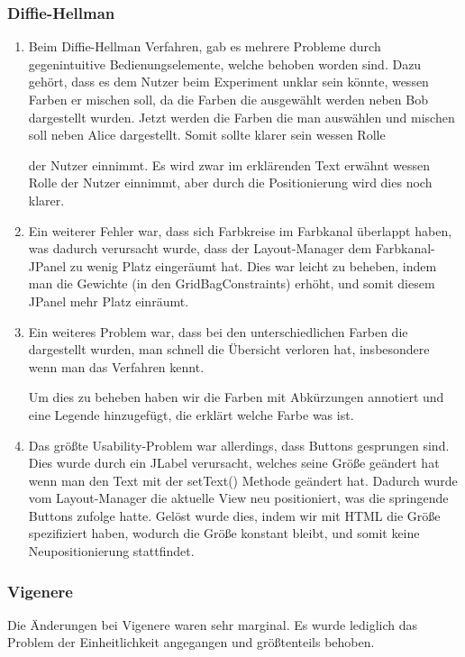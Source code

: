 \documentclass{article}
\begin{document}
     \subsubsection{Diffie-Hellman}
     \begin{enumerate}
         \item Beim Diffie-Hellman Verfahren, gab es mehrere Probleme durch gegenintuitive Bedienungselemente, welche behoben worden sind.
             Dazu gehört, dass es dem Nutzer beim Experiment unklar sein könnte, wessen Farben er mischen soll,
             da die Farben die ausgewählt werden neben Bob dargestellt wurden. Jetzt werden die Farben
             die man auswählen und mischen soll neben Alice dargestellt. Somit sollte klarer sein wessen Rolle

             der Nutzer einnimmt.
             Es wird zwar im erklärenden Text erwähnt wessen Rolle der Nutzer einnimmt, aber durch die Positionierung
             wird dies noch klarer.
         \item Ein weiterer Fehler war, dass sich Farbkreise im Farbkanal überlappt haben,
             was dadurch verursacht wurde, dass der Layout-Manager dem Farbkanal-JPanel zu wenig Platz eingeräumt hat.
             Dies war leicht zu beheben, indem man die Gewichte (in den GridBagConstraints) erhöht,
             und somit diesem JPanel mehr Platz einräumt.

         \item Ein weiteres Problem war, dass bei den unterschiedlichen Farben die dargestellt wurden,
             man schnell die Übersicht verloren hat, insbesondere wenn man das Verfahren kennt.

             Um dies zu beheben haben wir die Farben mit Abkürzungen annotiert und eine Legende hinzugefügt,
             die erklärt welche Farbe was ist.
         \item Das größte Usability-Problem war allerdings, dass Buttons gesprungen sind.
             Dies wurde durch ein JLabel verursacht, welches seine Größe geändert hat
             wenn man den Text mit der setText() Methode geändert hat.
             Dadurch wurde vom Layout-Manager die aktuelle View neu positioniert, was die springende Buttons
             zufolge hatte.
             Gelöst wurde dies, indem wir mit HTML die Größe spezifiziert haben, wodurch die Größe konstant bleibt,
             und somit keine Neupositionierung stattfindet.
     \end{enumerate}
     
     \subsubsection{Vigenere}
       Die Änderungen bei Vigenere waren sehr marginal. Es wurde lediglich das Problem der Einheitlichkeit angegangen und größtenteils behoben.
\end{document}

